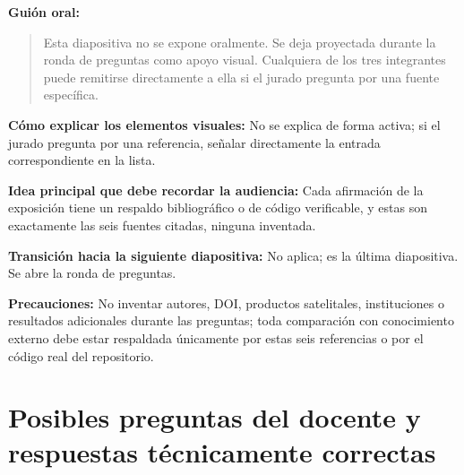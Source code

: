 \documentclass[11pt,a4paper]{article}
\newcommand{\campo}[2]{\par\medskip\noindent\textbf{#1:} #2\par}
\newenvironment{guionoral}{%
  \medskip\noindent\textbf{Gui\'on oral:}\par\smallskip
  \begin{quote}\small
}{%
  \end{quote}
}
\begin{document}
\begin{guionoral}
Esta diapositiva no se expone oralmente. Se deja proyectada durante la
ronda de preguntas como apoyo visual. Cualquiera de los tres
integrantes puede remitirse directamente a ella si el jurado pregunta
por una fuente espec\'ifica.
\end{guionoral}

\campo{C\'omo explicar los elementos visuales}{No se explica de forma
activa; si el jurado pregunta por una referencia, se\~nalar directamente
la entrada correspondiente en la lista.}
\campo{Idea principal que debe recordar la audiencia}{Cada afirmaci\'on
de la exposici\'on tiene un respaldo bibliogr\'afico o de c\'odigo
verificable, y estas son exactamente las seis fuentes citadas, ninguna
inventada.}
\campo{Transici\'on hacia la siguiente diapositiva}{No aplica; es la
\'ultima diapositiva. Se abre la ronda de preguntas.}
\campo{Precauciones}{No inventar autores, DOI, productos satelitales,
instituciones o resultados adicionales durante las preguntas; toda
comparaci\'on con conocimiento externo debe estar respaldada
\'unicamente por estas seis referencias o por el c\'odigo real del
repositorio.}

\newpage

\section{Posibles preguntas del docente y respuestas t\'ecnicamente correctas}
\end{document}
